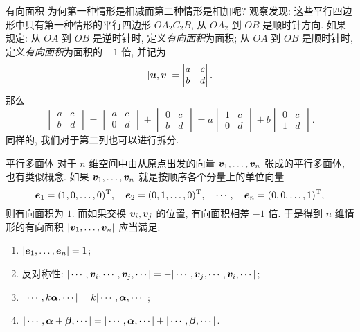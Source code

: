 \begin{frame}{有向面积\noexer}
	\onslide<+->
	为何第一种情形是相减而第二种情形是相加呢?
	\onslide<+->
	观察发现: 这些平行四边形中只有第一种情形的平行四边形 $OA_2C_2B$, 从 $OA_2$ 到 $OB$ 是顺时针方向.
	\onslide<+->
	如果规定: 从 $OA$ 到 $OB$ 是逆时针时, 定义\emph{有向面积}为面积; 从 $OA$ 到 $OB$ 是顺时针时, 定义\emph{有向面积}为面积的 $-1$ 倍,
	\onslide<+->
	并记为
	\[|{\boldsymbol{u}},{\boldsymbol{v}}|=\begin{vmatrix}
		a&c\\b&d
	\end{vmatrix}.\]
	\onslide<+->
	那么
	\[\begin{vmatrix}
		a&c\\b&d
	\end{vmatrix}=\begin{vmatrix}
		a&c\\0&d
	\end{vmatrix}+\begin{vmatrix}
		0&c\\b&d
	\end{vmatrix}=a\begin{vmatrix}
		1&c\\0&d
	\end{vmatrix}+b\begin{vmatrix}
		0&c\\1&d
	\end{vmatrix}.\]
	\onslide<+->
	同样的, 我们对于第二列也可以进行拆分.
\end{frame}


\begin{frame}{平行多面体\noexer}
	\onslide<+->
	对于 $n$ 维空间中由从原点出发的向量 ${\boldsymbol{v}}_1,\dots,{\boldsymbol{v}}_n$ 张成的平行多面体, 也有类似概念.
	\onslide<+->
	如果 ${\boldsymbol{v}}_1,\dots,{\boldsymbol{v}}_n$ 就是按顺序各个分量上的单位向量
	\[{\boldsymbol{e}}_1=(1,0,\dots,0)^{\mathrm{T}},\quad
	{\boldsymbol{e}}_2=(0,1,\dots,0)^{\mathrm{T}},\quad\cdots,\quad
	{\boldsymbol{e}}_n=(0,0,\dots,1)^{\mathrm{T}},\]
	则有向面积为 $1$.
	\onslide<+->
	而如果交换 ${\boldsymbol{v}}_i,{\boldsymbol{v}}_j$ 的位置, 有向面积相差 $-1$ 倍.
	\onslide<+->
	于是得到 $n$ 维情形的有向面积 $|{\boldsymbol{v}}_1,\dots,{\boldsymbol{v}}_n|$ 应当满足:
	\begin{enumerate}
		\item $|{\boldsymbol{e}}_1,\dots,{\boldsymbol{e}}_n|=1$;
		\item 反对称性: $|\cdots,{\boldsymbol{v}}_i,\cdots,{\boldsymbol{v}}_j,\cdots|=-|\cdots,{\boldsymbol{v}}_j,\cdots,{\boldsymbol{v}}_i,\cdots|$;
		\item $|\cdots,k{\boldsymbol{\alpha}},\cdots|=k|\cdots,{\boldsymbol{\alpha}},\cdots|$;
		\item $|\cdots,{\boldsymbol{\alpha}}+{\boldsymbol{\beta}},\cdots|=|\cdots,{\boldsymbol{\alpha}},\cdots|+|\cdots,{\boldsymbol{\beta}},\cdots|$.
	\end{enumerate}
\end{frame}


